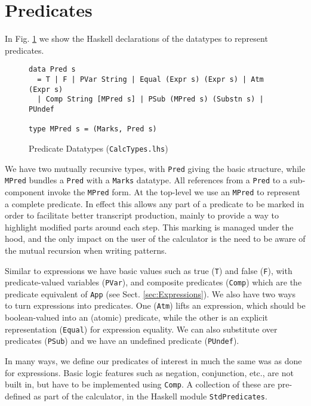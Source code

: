 \section{Predicates}\label{sec:Predicates}

In Fig. \ref{fig:pred-types} we show the Haskell declarations
of the datatypes to represent predicates.
\begin{figure}[tb]
\begin{verbatim}
data Pred s
  = T | F | PVar String | Equal (Expr s) (Expr s) | Atm (Expr s)
  | Comp String [MPred s] | PSub (MPred s) (Substn s) | PUndef

type MPred s = (Marks, Pred s)
\end{verbatim}
  \caption{Predicate Datatypes (\texttt{CalcTypes.lhs})}
  \label{fig:pred-types}
\end{figure}
We have two mutually recursive types,
with \texttt{Pred} giving the basic structure,
while \texttt{MPred} bundles a \texttt{Pred}
with a \texttt{Marks} datatype.
All references from a \texttt{Pred} to a sub-component invoke
the \texttt{MPred} form.
At the top-level we use an \texttt{MPred} to represent a complete predicate.
In effect this allows any part of a predicate to be marked
in order to facilitate better transcript production,
mainly to provide a way to highlight modified parts
around each step.
This marking is managed under the hood,
and the only impact on the user of the calculator
is the need to be aware of the mutual recursion
when writing patterns.

Similar to expressions we have basic values such as true (\texttt{T})
and false (\texttt{F}),
 with predicate-valued variables (\texttt{PVar}),
and composite predicates (\texttt{Comp}) which are the predicate equivalent
of \texttt{App} (see Sect. \ref{sec:Expressions}).
We also have two ways to turn expressions into predicates.
One (\texttt{Atm}) lifts an expression, which should be boolean-valued
into an (atomic) predicate,
while the other is an explicit representation (\texttt{Equal})
for expression equality.
We can also substitute over predicates (\texttt{PSub})
and we have an undefined predicate (\texttt{PUndef}).

In many ways,
we define our predicates of interest
in much the same was as done for expressions.
Basic logic features such as negation, conjunction, etc.,
are not built in,
but have to be implemented using \texttt{Comp}.
A collection of these are pre-defined as part of the calculator,
in the Haskell module \texttt{StdPredicates}.

